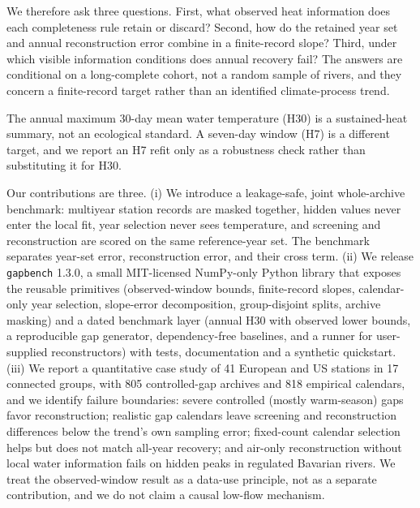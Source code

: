 We therefore ask three questions. First, what observed heat information does each completeness rule retain or discard? Second, how do the retained year set and annual reconstruction error combine in a finite-record slope? Third, under which visible information conditions does annual recovery fail? The answers are conditional on a long-complete cohort, not a random sample of rivers, and they concern a finite-record target rather than an identified climate-process trend.

The annual maximum 30-day mean water temperature ($\mathrm{H30}$) is a sustained-heat summary, not an ecological standard. A seven-day window (H7) is a different target, and we report an H7 refit only as a robustness check rather than substituting it for $\mathrm{H30}$.

Our contributions are three. (i) We introduce a leakage-safe, joint whole-archive benchmark: multiyear station records are masked together, hidden values never enter the local fit, year selection never sees temperature, and screening and reconstruction are scored on the same reference-year set. The benchmark separates year-set error, reconstruction error, and their cross term. (ii) We release \texttt{gapbench} 1.3.0, a small MIT-licensed NumPy-only Python library that exposes the reusable primitives (observed-window bounds, finite-record slopes, calendar-only year selection, slope-error decomposition, group-disjoint splits, archive masking) and a dated benchmark layer (annual H30 with observed lower bounds, a reproducible gap generator, dependency-free baselines, and a runner for user-supplied reconstructors) with tests, documentation and a synthetic quickstart. (iii) We report a quantitative case study of 41 European and US stations in 17 connected groups, with 805 controlled-gap archives and 818 empirical calendars, and we identify failure boundaries: severe controlled (mostly warm-season) gaps favor reconstruction; realistic gap calendars leave screening and reconstruction differences below the trend's own sampling error; fixed-count calendar selection helps but does not match all-year recovery; and air-only reconstruction without local water information fails on hidden peaks in regulated Bavarian rivers. We treat the observed-window result as a data-use principle, not as a separate contribution, and we do not claim a causal low-flow mechanism.

